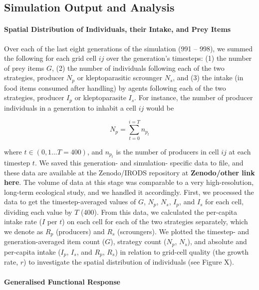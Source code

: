 \documentclass[11pt]{article}
\begin{document}
\subsection*{Simulation Output and Analysis}

\paragraph{Spatial Distribution of Individuals, their Intake, and Prey Items}

Over each of the last eight generations of the simulation (991 -- 998), we summed the following for each grid cell $ij$ over the generation's timesteps: (1) the number of prey items $G$, (2) the number of individuals following each of the two strategies, producer $N_p$ or kleptoparasitic scrounger $N_s$, and (3) the intake (in food items consumed after handling) by agents following each of the two strategies, producer $I_p$ or kleptoparasite $I_s$.
For instance, the number of producer individuals in a generation to inhabit a cell $ij$ would be
\begin{linenomath*}
    \begin{equation*}
        N_p = \sum_{t=0}^{i=T} n_{p_t}
    \end{equation*}
\end{linenomath*}
where $t \in (0, 1 \dots T = 400)$, and $n_{p_t}$ is the number of producers in cell $ij$ at each timestep $t$.
We saved this generation- and simulation- specific data to file, and these data are available at the Zenodo/IRODS repository at \textbf{Zenodo/other link here}.
The volume of data at this stage was comparable to a very high-resolution, long-term ecological study, and we handled it accordingly.
First, we processed the data to get the timestep-averaged values of $G$, $N_p$, $N_s$, $I_p$, and $I_s$ for each cell, dividing each value by $T$ (400).
From this data, we calculated the per-capita intake rate ($I$ per $t$) on each cell for each of the two strategies separately, which we denote as $R_p$ (producers) and $R_s$ (scroungers).
We plotted the timestep- and generation-averaged item count ($G$), strategy count ($N_p$, $N_s$), and absolute and per-capita intake ($I_p$, $I_s$, and $R_p$, $R_s$) in relation to grid-cell quality (the growth rate, $r$) to investigate the spatial distribution of individuals (see Figure X).

\paragraph{Generalised Functional Response}
\end{document}
